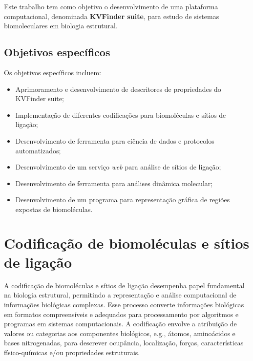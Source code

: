 \documentclass[Portugues]{phdquali}
\def\eg{e.g.\onedot}
\begin{document}
Este trabalho tem como objetivo o desenvolvimento de uma plataforma computacional, denominada \textbf{KVFinder suite}, para estudo de sistemas biomoleculares em biologia estrutural.

\section{Objetivos específicos}

Os objetivos específicos incluem: 

\begin{itemize}
  \item Aprimoramento e desenvolvimento de descritores de propriedades do KVFinder suite;
  \item Implementação de diferentes codificações para biomoléculas e sítios de ligação; %
  \item Desenvolvimento de ferramenta para ciência de dados e protocolos automatizados; %
  \item Desenvolvimento de um serviço \textit{web} para análise de sítios de ligação; %
  \item Desenvolvimento de ferramenta para análises dinâmica molecular; %
  \item Desenvolvimento de um programa para representação gráfica de regiões expostas de biomoléculas. %
\end{itemize}


\chapter{Codificação de biomoléculas e sítios de ligação}


A codificação de biomoléculas e sítios de ligação desempenha papel fundamental na biologia estrutural, permitindo a representação e análise computacional de informações biológicas complexas. Esse processo converte informações biológicas em formatos compreensíveis e adequados para processamento por algoritmos e programas em sistemas computacionais. A codificação envolve a atribuição de valores ou categorias aos componentes biológicos, \eg, átomos, aminoácidos e bases nitrogenadas, para descrever ocupância, localização, forças, características físico-químicas e/ou propriedades estruturais. 
\end{document}
